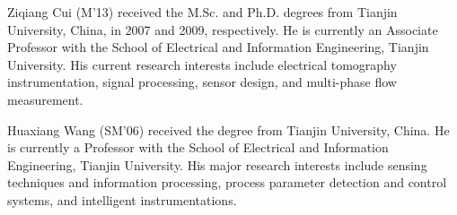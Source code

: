 % 
%

\begin{IEEEbiography}{Ziqiang Cui}
(M'13) received the M.Sc. and Ph.D. degrees from Tianjin University, China, in 2007 and 2009, respectively. He is currently an Associate Professor with the School of Electrical and Information Engineering, Tianjin University. His current research interests include electrical tomography instrumentation, signal processing, sensor design, and multi-phase flow measurement.
\end{IEEEbiography}


\begin{IEEEbiography}{Huaxiang Wang}
(SM'06) received the degree from Tianjin University, China. He is currently a Professor with the School of Electrical and Information Engineering, Tianjin University.  His major research interests include sensing techniques and information processing, process parameter detection and control systems, and intelligent instrumentations.
\end{IEEEbiography}


\vfill




